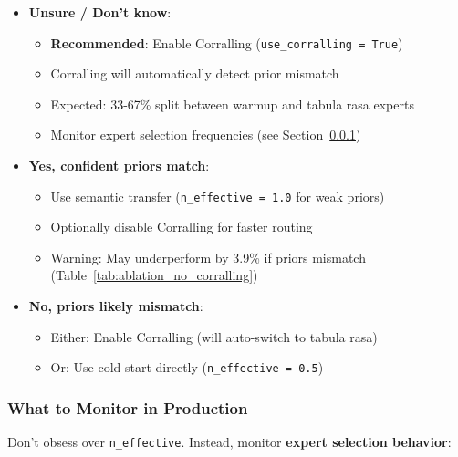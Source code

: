 \begin{itemize}[leftmargin=*, itemsep=2pt]
    \item \textbf{Unsure / Don't know}:
    \begin{itemize}
        \item \textbf{Recommended}: Enable Corralling (\texttt{use\_corralling = True})
        \item Corralling will automatically detect prior mismatch
        \item Expected: 33-67\% split between warmup and tabula rasa experts
        \item Monitor expert selection frequencies (see Section~\ref{sec:monitoring})
    \end{itemize}
    
    \item \textbf{Yes, confident priors match}:
    \begin{itemize}
        \item Use semantic transfer (\texttt{n\_effective = 1.0} for weak priors)
        \item Optionally disable Corralling for faster routing
        \item Warning: May underperform by 3.9\% if priors mismatch (Table~\ref{tab:ablation_no_corralling})
    \end{itemize}
    
    \item \textbf{No, priors likely mismatch}:
    \begin{itemize}
        \item Either: Enable Corralling (will auto-switch to tabula rasa)
        \item Or: Use cold start directly (\texttt{n\_effective = 0.5})
    \end{itemize}
\end{itemize}


\subsubsection{What to Monitor in Production}
\label{sec:monitoring}

Don't obsess over \texttt{n\_effective}. Instead, monitor \textbf{expert selection behavior}:

